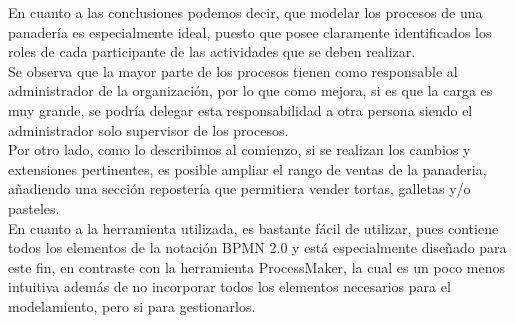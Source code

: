 En cuanto a las conclusiones podemos decir, que modelar los procesos de una panadería es especialmente ideal, puesto que posee claramente identificados los roles de cada participante de las actividades que se deben realizar.\\
Se observa que la mayor parte de los procesos tienen como responsable al administrador de la organización, por lo que como mejora, si es que la carga es muy grande, se podría delegar esta responsabilidad a otra persona siendo el administrador solo supervisor de los procesos.\\
Por otro lado, como lo describimos al comienzo, si se realizan los cambios y extensiones pertinentes, es posible ampliar el rango de ventas de la panaderia, añadiendo una sección repostería que permitiera vender tortas, galletas y/o pasteles.\\
En cuanto a la herramienta utilizada, es bastante fácil de utilizar, pues contiene todos los elementos de la notación BPMN 2.0 y está especialmente diseñado para este fin, en contraste con la herramienta ProcessMaker, la cual es un poco menos intuitiva además de no incorporar todos los elementos necesarios para el modelamiento, pero si para gestionarlos.